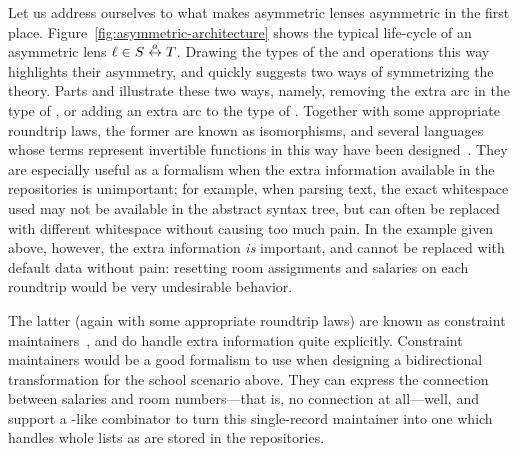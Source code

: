 Let us address ourselves to what makes asymmetric lenses asymmetric in the
first place. Figure~\ref{fig:asymmetric-architecture} shows the typical
life-cycle of an asymmetric lens $\ell \in S \overset{a}{\leftrightarrow} T$. Drawing the types of
the \GET and \PUT operations this way highlights their asymmetry, and
quickly suggests two ways of symmetrizing the theory. Parts
 and
 illustrate these two ways,
namely, removing the extra arc in the type of \PUT, or adding an extra arc
to the type of \GET. Together with some appropriate roundtrip laws, the
former are known as isomorphisms, and several languages whose terms
represent invertible functions in this way have been
designed~\cite{xsugar,rendel2010invertible}. They are especially useful as a
formalism when the extra information available in the repositories is
unimportant; for example, when parsing text, the exact whitespace used may
not be available in the abstract syntax tree, but can often be replaced with
different whitespace without causing too much pain. In the example given
above, however, the extra information \emph{is} important, and cannot be
replaced with default data without pain: resetting room assignments and
salaries on each roundtrip would be very undesirable behavior.

The latter (again with some appropriate roundtrip laws) are known as
constraint maintainers~\cite{Meertens98}, and do handle extra information
quite explicitly. Constraint maintainers would be a good formalism to use
when designing a bidirectional transformation for the school scenario above.
They can express the connection between salaries and room numbers---that is,
no connection at all---well, and support a \map-like combinator to turn this
single-record maintainer into one which handles whole lists as are stored in
the repositories.

